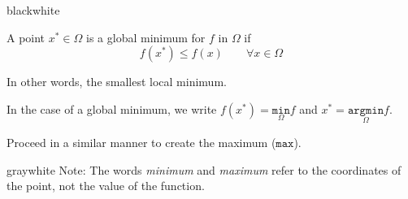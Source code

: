 \begin{remark}{black}{white}
    \begin{definition}
        A point \( x^* \in \Omega \) is a global minimum for \( f \) in \( \Omega \) if
        \[
            f(x^*) \leq f(x) \qquad \forall x \in \Omega
        \]
    \end{definition}
\end{remark}

In other words, the smallest local minimum.

\begin{center}
\end{center}

In the case of a global minimum, we write \( f(x^*) = \underset{\Omega}{\mathtt{min}}f \) and \( x^* = \underset{\Omega}{\mathtt{argmin}} f \). 

Proceed in a similar manner to create the maximum (\( \mathtt{max} \)).

\begin{remark}{gray}{white}
    Note: The words \textit{minimum} and \textit{maximum} refer to the coordinates of the point, not the value of the function.

\end{remark}

